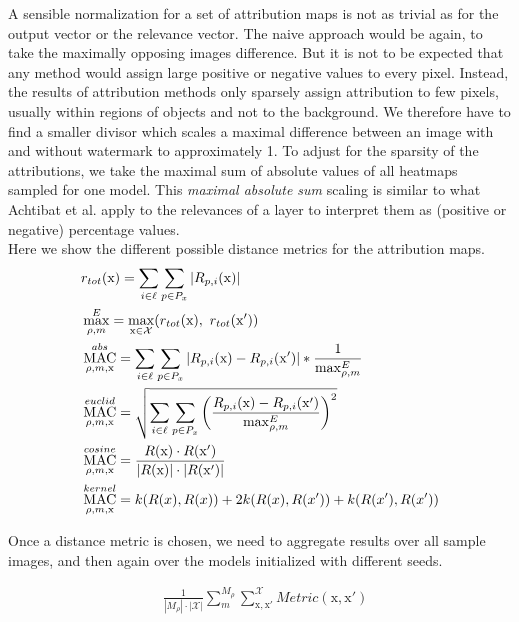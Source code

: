 A sensible normalization for a set of attribution maps is not as trivial as for the output vector or the relevance vector. The naive approach would be again, to take the maximally opposing images difference. But it is not to be expected that any method would assign large positive or negative values to every pixel. Instead, the results of attribution methods only sparsely assign attribution to few pixels, usually within regions of objects and not to the background. 
We therefore have to find a smaller divisor which scales a maximal difference between an image with and without watermark to approximately 1.
To adjust for the sparsity of the attributions, we take the maximal sum of absolute values of all heatmaps sampled for one model. This \textit{maximal absolute sum} scaling is similar to what Achtibat et al. \cite{Achtibat2022} apply to the relevances of a layer to interpret them as (positive or negative) percentage values.\\

Here we show the different possible distance metrics for the attribution maps.
\begin{align}
\displaystyle 
& r_{tot}(\mathrm{x}) = \sum_{i \in \ell} \sum_{p \in P_x} 
|R_{p,i}(\mathrm{x})| \notag \\
& \max_{\rho, m}^E = \max_{\mathrm{x} \in \mathcal{X}} (r_{tot}(\mathrm{x}) , \  r_{tot}(\mathrm{x}') ) \notag \\
& \operatorname*{MAC}_{\rho, m, \mathrm{x}}^{abs} = 
\sum_{i \in \ell} \sum_{p \in P_x} |R_{p,i}(\mathrm{x}) -R_{p,i}(\mathrm{x}')|* \frac{1}{\max_{\rho, m}^E} \\
& \operatorname*{MAC}_{\rho, m, \mathrm{x}}^{euclid} = \sqrt{ \sum_{i \in \ell} 
\sum_{p \in P_x}\left(\frac{R_{p,i}(\mathrm{x}) -R_{p,i}(\mathrm{x}')}{\max_{\rho, m}^E}\right)^2
} \\
& \operatorname*{MAC}_{\rho, m,\mathrm{x}}^{cosine} =
\frac{R(\mathrm{x}) \cdot R(\mathrm{x}') }{|R(\mathrm{x})|\cdot |R(\mathrm{x}')|} \\
& \operatorname*{MAC}_{\rho, m, \mathrm{x}}^{kernel} = k(R(x) ,R(x) ) + 2 k(R(x) ,R(x') ) + k(R(x') ,R(x') )  
\end{align}

Once a distance metric is chosen, we need to aggregate results over all sample images, and then again over the models initialized with different seeds.

\begin{align}
& \frac{1}{|M_\rho|\cdot |\mathcal{X}| }\sum_{m}^{M_{\rho}} \sum_{\mathrm{x,x'}}^{\mathcal{X}} Metric(\mathrm{x,x'})
\end{align}

